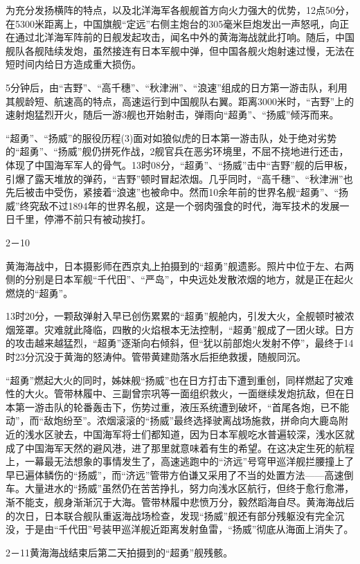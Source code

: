 \documentclass[12pt,UTF8]{ctexbook}
\begin{document}
为充分发扬横阵的特点，以及北洋海军各舰舰首方向火力强大的优势，12点50分，在5300米距离上，中国旗舰“定远”右侧主炮台的305毫米巨炮发出一声怒吼，向正在通过北洋海军阵前的日舰发起攻击，闻名中外的黄海海战就此打响。随后，中国舰队各舰陆续发炮，虽然接连有日本军舰中弹，但中国各舰火炮射速过慢，无法在短时间内给日方造成重大损伤。

5分钟后，由“吉野”、“高千穗”、“秋津洲”、“浪速”组成的日方第一游击队，利用其舰龄短、航速高的特点，高速运行到中国舰队右翼。距离3000米时，“吉野”上的速射炮猛烈开火，随后一游3舰也开始射击，弹雨向“超勇”、“扬威”倾泻而来。

“超勇”、“扬威”的服役历程(3)面对如狼似虎的日本第一游击队，处于绝对劣势的“超勇”、“扬威”舰仍拼死作战，2舰官兵在恶劣环境里，不屈不挠地进行还击，体现了中国海军军人的骨气。13时08分，“超勇”、“扬威”击中“吉野”舰的后甲板，引爆了露天堆放的弹药，“吉野”顿时冒起浓烟。几乎同时，“高千穗”、“秋津洲”也先后被击中受伤，紧接着“浪速”也被命中。然而10余年前的世界名舰“超勇”、“扬威”终究敌不过1894年的世界名舰，这是一个弱肉强食的时代，海军技术的发展一日千里，停滞不前只有被动挨打。

2－10

黄海海战中，日本摄影师在西京丸上拍摄到的“超勇”舰遗影。照片中位于左、右两侧的分别是日本军舰“千代田”、“严岛”，中央远处发散浓烟的地方，就是正在起火燃烧的“超勇”。

13时20分，一颗敌弹射入早已创伤累累的“超勇”舰舱内，引发大火，全舰顿时被浓烟笼罩。灾难就此降临，四散的火焰根本无法控制，“超勇”舰成了一团火球。日方的攻击越来越猛烈，“超勇”逐渐向右倾斜，但“犹以前部炮火发射不停”，最终于14时23分沉没于黄海的怒涛仲。管带黄建勋落水后拒绝救援，随舰同沉。

“超勇”燃起大火的同时，姊妹舰“扬威”也在日方打击下遭到重创，同样燃起了灾难性的大火。管带林履中、三副曾宗巩等一面组织救火，一面继续发炮抗敌，但在日本第一游击队的轮番轰击下，伤势过重，液压系统遭到破坏，“首尾各炮，已不能动”，而“敌炮纷至”。浓烟滚滚的“扬威”最终选择驶离战场施救，拼命向大鹿岛附近的浅水区驶去，中国海军将士们都知道，因为日本军舰吃水普遍较深，浅水区就成了中国海军天然的避风港，进了那里就意味着有生的希望。在这决定生死的航程上，一幕最无法想象的事情发生了，高速逃跑中的“济远”号穹甲巡洋舰拦腰撞上了早已遍体鳞伤的“扬威”，而“济远”管带方伯谦又采用了不当的处置方法——高速倒车。大量进水的“扬威”虽然仍在苦苦挣扎，努力向浅水区航行，但终于愈行愈滞，渐不能支，舰身渐渐沉于大海。管带林履中悲愤万分，毅然蹈海自尽。黄海海战后的次日，日本联合舰队重返海战场检查，发现“扬威”舰还有部分残躯没有完全沉没，于是由“千代田”号装甲巡洋舰近距离发射鱼雷，“扬威”彻底从海面上消失了。

2－11黄海海战结束后第二天拍摄到的“超勇”舰残骸。
\end{document}
